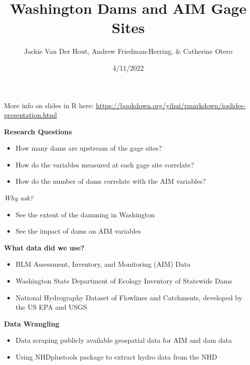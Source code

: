 \documentclass[
  ignorenonframetext,
]{beamer}
\title{Washington Dams and AIM Gage Sites}
\author{Jackie Van Der Hout, Andrew Friedman-Herring, \& Catherine
Otero}
\date{4/11/2022}
\providecommand{\tightlist}{%
  \setlength{\itemsep}{0pt}\setlength{\parskip}{0pt}}
\begin{document}
\frame{\titlepage}

\begin{frame}
More info on slides in R here:
\url{https://bookdown.org/yihui/rmarkdown/ioslides-presentation.html}
\end{frame}

\begin{frame}{\textbf{Research Questions}}
\protect\hypertarget{research-questions}{}
\begin{itemize}
\tightlist
\item
  How many dams are upstream of the gage sites?
\item
  How do the variables measured at each gage site correlate?
\item
  How do the number of dams correlate with the AIM variables?
\end{itemize}

\begin{block}{\emph{Why ask?}}
\protect\hypertarget{why-ask}{}
\begin{itemize}
\tightlist
\item
  See the extent of the damming in Washington
\item
  See the impact of dams on AIM variables
\end{itemize}
\end{block}
\end{frame}

\begin{frame}{\textbf{What data did we use?}}
\protect\hypertarget{what-data-did-we-use}{}
\begin{itemize}
\tightlist
\item
  BLM Assessment, Inventory, and Monitoring (AIM) Data
\item
  Washington State Department of Ecology Inventory of Statewide Dams
\item
  National Hydrography Dataset of Flowlines and Catchments, developed by
  the US EPA and USGS
\end{itemize}
\end{frame}

\begin{frame}{\textbf{Data Wrangling}}
\protect\hypertarget{data-wrangling}{}
\begin{itemize}
\tightlist
\item
  Data scraping publicly available geospatial data for AIM and dam data
\item
  Using NHDplustools package to extract hydro data from the NHD
\end{itemize}
\end{frame}
\end{document}
